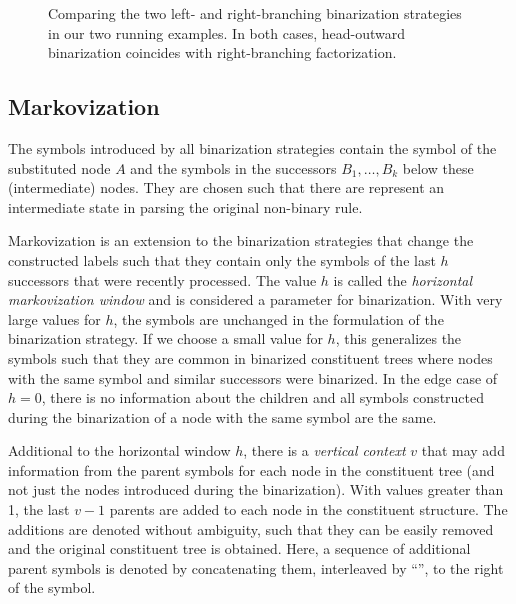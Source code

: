 \documentclass[../../document.tex]{subfiles}
\begin{document}
    \begin{figure}
        \resizebox{.3\linewidth}{!}{}\hfill
        \resizebox{.3\linewidth}{!}{}\hfill
        \resizebox{.3\linewidth}{!}{}

        \vspace{.5cm}

        \resizebox{.3\linewidth}{!}{}\hfill
        \resizebox{.3\linewidth}{!}{}\hfill
        \resizebox{.3\linewidth}{!}{}

        \caption{\label{fig:ex:binarization}
            Comparing the two left- and right-branching binarization strategies in our two running examples.
            In both cases, head-outward binarization coincides with right-branching factorization.
        }
    \end{figure}


    \subsection{Markovization}
    The symbols introduced by all binarization strategies contain the symbol of the substituted node \(A\) and the symbols in the successors \(B_1, \ldots, B_k\) below these (intermediate) nodes.
    They are chosen such that there are represent an intermediate state in parsing the original non-binary rule.

    Markovization is an extension to the binarization strategies that change the constructed labels such that they contain only the symbols of the last \(h\) successors that were recently processed.
    The value \(h\) is called the \emph{horizontal markovization window} and is considered a parameter for binarization.
    With very large values for \(h\), the symbols are unchanged in the formulation of the binarization strategy.
    If we choose a small value for \(h\), this generalizes the symbols such that they are common in binarized constituent trees where nodes with the same symbol and similar successors were binarized.
    In the edge case of \(h=0\), there is no information about the children and all symbols constructed during the binarization of a node with the same symbol are the same.

    Additional to the horizontal window \(h\), there is a \emph{vertical context} \(v\) that may add information from the parent symbols for each node in the constituent tree (and not just the nodes introduced during the binarization).
    With values greater than 1, the last \(v-1\) parents are added to each node in the constituent structure.
    The additions are denoted without ambiguity, such that they can be easily removed and the original constituent tree is obtained.
    Here, a sequence of additional parent symbols is denoted by concatenating them, interleaved by ``\cn{$\wedge$}'', to the right of the symbol.
\end{document}
